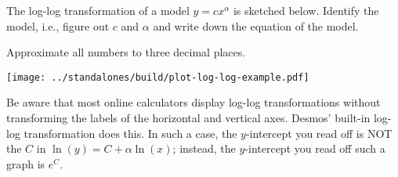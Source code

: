 \documentclass[../main.tex]{subfiles}
\begin{document}
\begin{example}
  The log-log transformation of a model \(y = c x^{\alpha}\) is sketched below.  Identify the model, i.e., figure out \(c\) and \(\alpha\) and write down the equation of the model. 

  Approximate all numbers to three decimal places.

  \texttt{[image: ../standalones/build/plot-log-log-example.pdf]}
\end{example}


\bigskip{}

\faCalculator{} Be aware that most online calculators display log-log transformations without transforming the labels of the horizontal and vertical axes. Desmos' built-in log-log transformation does this. \faExclamationTriangle{} In such a case, the \(y\)-intercept you read off  is NOT the \(C\) in \(\ln(y) = C + \alpha \ln(x)\); instead, the \(y\)-intercept you read off such a graph is \(e^{C}\).
\end{document}

